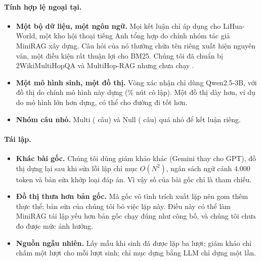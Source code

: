 \paragraph{Tính hợp lệ ngoại tại.}
\begin{itemize}
  \item \textbf{Một bộ dữ liệu, một ngôn ngữ.} Mọi kết luận chỉ áp dụng cho LiHua-World, một kho hội thoại tiếng Anh tổng hợp do chính nhóm tác giả MiniRAG xây dựng.
  Câu hỏi của nó thường chứa tên riêng xuất hiện nguyên văn, một điều kiện rất thuận lợi cho BM25.
  Chúng tôi đã chuẩn bị 2WikiMultiHopQA và MultiHop-RAG nhưng chưa chạy .
  \item \textbf{Một mô hình sinh, một đồ thị.} Vòng xác nhận chỉ dùng Qwen2.5-3B, với đồ thị do chính mô hình này dựng (\graphIsolated\% nút cô lập).
  Một đồ thị dày hơn, ví dụ do mô hình lớn hơn dựng, có thể cho đường đi tốt hơn.
  \item \textbf{Nhóm câu nhỏ.} Multi (\nHeldMulti{} câu) và Null (\nHeldNull{} câu) quá nhỏ để kết luận riêng.
\end{itemize}

\paragraph{Tái lập.}
\begin{itemize}
  \item \textbf{Khác bài gốc.} Chúng tôi dùng giám khảo khác (Gemini thay cho GPT), đồ thị dựng lại sau khi sửa lỗi lập chỉ mục $O(N^2)$, ngân sách ngữ cảnh 4.000 token và bản sửa khớp loại đáp án.
  Vì vậy số của bài gốc chỉ là tham chiếu.
  \item \textbf{Đồ thị thưa hơn bản gốc.} Mã gốc vô tình trích xuất lặp nên gom thêm thực thể; bản sửa của chúng tôi bỏ việc lặp này.
  Điều này có thể làm MiniRAG tái lập yếu hơn bản gốc chạy đúng như công bố, và chúng tôi chưa đo được mức ảnh hưởng.
  \item \textbf{Nguồn ngẫu nhiên.} Lấy mẫu khi sinh đã được lặp ba lượt; giám khảo chỉ chấm một lượt cho mỗi lượt sinh; chỉ mục dựng bằng LLM chỉ dựng một lần.
\end{itemize}
